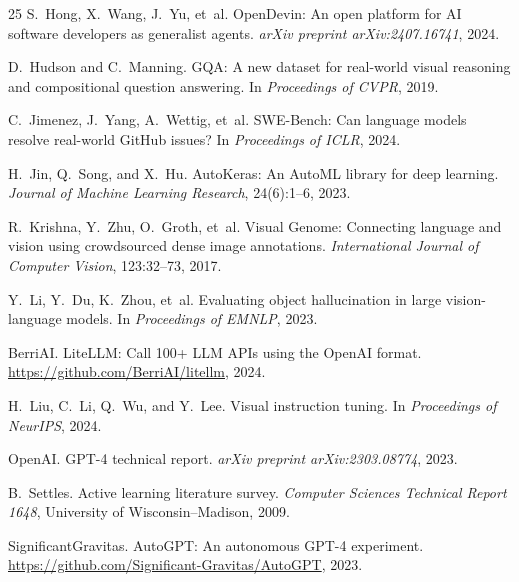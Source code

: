 \documentclass[11pt]{article}
\begin{document}
\begin{thebibliography}{25}
S.~Hong, X.~Wang, J.~Yu, et~al.
\newblock OpenDevin: An open platform for AI software developers as generalist agents.
\newblock \emph{arXiv preprint arXiv:2407.16741}, 2024.

D.~Hudson and C.~Manning.
\newblock GQA: A new dataset for real-world visual reasoning and compositional question answering.
\newblock In \emph{Proceedings of CVPR}, 2019.

C.~Jimenez, J.~Yang, A.~Wettig, et~al.
\newblock SWE-Bench: Can language models resolve real-world GitHub issues?
\newblock In \emph{Proceedings of ICLR}, 2024.

H.~Jin, Q.~Song, and X.~Hu.
\newblock AutoKeras: An AutoML library for deep learning.
\newblock \emph{Journal of Machine Learning Research}, 24(6):1--6, 2023.

R.~Krishna, Y.~Zhu, O.~Groth, et~al.
\newblock Visual Genome: Connecting language and vision using crowdsourced dense image annotations.
\newblock \emph{International Journal of Computer Vision}, 123:32--73, 2017.

Y.~Li, Y.~Du, K.~Zhou, et~al.
\newblock Evaluating object hallucination in large vision-language models.
\newblock In \emph{Proceedings of EMNLP}, 2023.

BerriAI.
\newblock LiteLLM: Call 100+ LLM APIs using the OpenAI format.
\newblock \url{https://github.com/BerriAI/litellm}, 2024.

H.~Liu, C.~Li, Q.~Wu, and Y.~Lee.
\newblock Visual instruction tuning.
\newblock In \emph{Proceedings of NeurIPS}, 2024.

OpenAI.
\newblock GPT-4 technical report.
\newblock \emph{arXiv preprint arXiv:2303.08774}, 2023.

B.~Settles.
\newblock Active learning literature survey.
\newblock \emph{Computer Sciences Technical Report 1648}, University of Wisconsin--Madison, 2009.

SignificantGravitas.
\newblock AutoGPT: An autonomous GPT-4 experiment.
\newblock \url{https://github.com/Significant-Gravitas/AutoGPT}, 2023.


\end{thebibliography}
\end{document}
